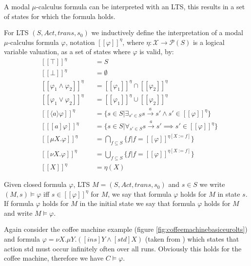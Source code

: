 A modal $\mu$-calculus formula can be interpreted with an LTS, this results in a set of states for which the formula holds.
\begin{definition}
	\label{def_mu_sem} For LTS $(S, Act, trans, s_0)$ we inductively define the interpretation of a modal $\mu$-calculus formula $\varphi$, notation
	$[\![ \varphi ]\!]^\eta$, where $\eta : \mathcal{X} \rightarrow \mathcal{P}(S)$ is a logical variable valuation, as a set of states
	where $\varphi$ is valid, by:
	\begin{align*}
	&[\![ \mathit{\top} ]\!]^\eta &&= S\\
	&[\![ \mathit{\bot} ]\!]^\eta &&= \emptyset\\
	&[\![ \varphi_1 \wedge \varphi_2 ]\!]^\eta &&= [\![ \varphi_1 ]\!]^\eta \cap [\![ \varphi_2 ]\!]^\eta \\
	&[\![ \varphi_1 \vee \varphi_2 ]\!]^\eta &&= [\![ \varphi_1 ]\!]^\eta \cup [\![ \varphi_2 ]\!]^\eta\\
	&[\![ \langle a \rangle \varphi ]\!]^\eta &&= \{s \in S|\exists_{s' \in S} s \xrightarrow {a} s' \wedge s' \in [\![ \varphi ]\!]^\eta\}\\
	&[\![ [ a ] \varphi ]\!]^\eta &&= \{s \in S|\forall_{s' \in S} s \xrightarrow {a} s' \implies s' \in [\![ \varphi ]\!]^\eta\}\\
	&[\![ \mu X. \varphi ]\!]^\eta &&= \bigcap_{f \subseteq S}\{f | f = [\![ \varphi ]\!]^{\eta[X:=f]}\}\\
	&[\![ \nu X. \varphi ]\!]^\eta &&= \bigcup_{f \subseteq S}\{f | f = [\![ \varphi ]\!]^{\eta[X:=f]}\}\\
	&[\![ X ]\!]^\eta &&= \eta(X)
	\end{align*}
\end{definition}

Given closed formula $\varphi$, LTS $M = (S, Act, trans, s_0)$ and $s \in S$ we write $(M,s) \models \varphi$ iff $s \in [\![ \varphi ]\!]^\eta$ for $M$, we say that formula $\varphi$ holds for $M$ in state $s$. If formula $\varphi$ holds for $M$ in the initial state we say that formula $\varphi$ holds for $M$ and write $M \models \varphi$.

Again consider the coffee machine example (figure \ref{fig:coffeemachinebasiceurolts}) and formula $\varphi = \nu X. \mu Y. ([ins]Y \wedge [std] X)$ (taken from \cite{FamBasedModelCheckingWithMCRL2}) which states that action std must occur infinitely often over all runs. Obviously this holds for the coffee machine, therefore we have $C \models \varphi$.

